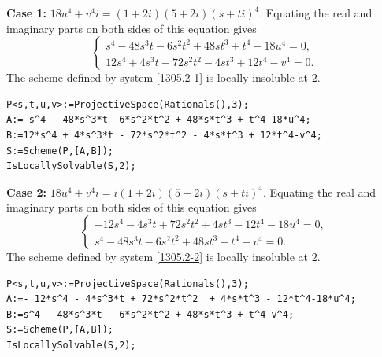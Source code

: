 \documentclass[a4paper,12pt,english,reqno]{amsart}
\begin{document}
{\bf Case 1:} $18u^4+v^4i=(1+2i)(5+2i)(s+ti)^4$. Equating the real and imaginary parts on both sides of this equation gives
\begin{equation}\label{1305.2-1}
\begin{cases}
s^4 - 48s^3t - 6s^2t^2 + 48st^3 + t^4 - 18u^4=0,\\
12s^4 + 4s^3t - 72s^2t^2 - 4st^3 + 12t^4 - v^4=0.
\end{cases}
\end{equation}
The scheme defined by system \eqref{1305.2-1} is locally insoluble at $2$.

\begin{lstlisting}
P<s,t,u,v>:=ProjectiveSpace(Rationals(),3);
A:= s^4 - 48*s^3*t -6*s^2*t^2 + 48*s*t^3 + t^4-18*u^4;
B:=12*s^4 + 4*s^3*t - 72*s^2*t^2 - 4*s*t^3 + 12*t^4-v^4;
S:=Scheme(P,[A,B]);
IsLocallySolvable(S,2);
\end{lstlisting}
{\bf Case 2:} $18u^4+v^4i=i(1+2i)(5+2i)(s+ti)^4$. Equating the real and imaginary parts on both sides of this equation gives
\begin{equation}\label{1305.2-2}
\begin{cases}
-12s^4 - 4s^3t + 72s^2t^2 + 4st^3 - 12t^4 - 18u^4=0,\\
s^4 - 48s^3t - 6s^2t^2 + 48st^3 + t^4 - v^4=0.
\end{cases}
\end{equation}
The scheme defined by system \eqref{1305.2-2} is locally insoluble at $2$.

\begin{lstlisting}
P<s,t,u,v>:=ProjectiveSpace(Rationals(),3);
A:=- 12*s^4 - 4*s^3*t + 72*s^2*t^2  + 4*s*t^3 - 12*t^4-18*u^4;
B:=s^4 - 48*s^3*t - 6*s^2*t^2 + 48*s*t^3 + t^4-v^4;
S:=Scheme(P,[A,B]);
IsLocallySolvable(S,2);
\end{lstlisting}
\end{document}
